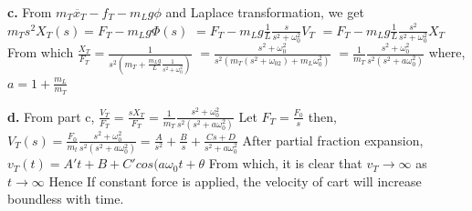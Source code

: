 \documentclass{beamer}
\begin{document}
\begin{frame}
\newline\textbf{c.}\newline
From $m_T\ddot{x_T} - f_T - m_Lg\phi$ and Laplace transformation, we get\newline\newline 
$m_Ts^2X_T(s) = F_T - m_Lg\Phi(s)$\newline\newline
$ = F_T - m_Lg\frac{1}{L}\frac{s}{s^2 + \omega_0^2}V_T$
$ = F_T - m_Lg\frac{1}{L}\frac{s^2}{s^2 + \omega_0^2}X_T$
\newline\newline
From which\newline\newline
$\frac{X_T}{F_T} = \frac{1}{s^2(m_T + \frac{m_Lg}{L}\frac{1}{s^2 + \omega_0^2})}$
$ = \frac{s^2 + \omega_0^2}{s^2(m_T(s^2 + \omega_02) + m_L\omega_0^2)}$
$ = \frac{1}{m_T}\frac{s^2 + \omega_0^2}{s^2(s^2 + a\omega_0^2)}$
\newline\newline
where, \newline \newline
$a = 1 + \frac{m_L}{m_T}$
    
\end{frame}


\begin{frame}
\newline\textbf{d.}\newline
From part c,\newline\newline
$\frac{V_T}{F_T} = \frac{sX_T}{F_T} = \frac{1}{m_T}\frac{s^2 + \omega_0^2}{s^2(s^2 + a\omega_0^2)}$\newline\newline
Let $F_T = \frac{F_0}{s}$ then,\newline\newline
$V_T(s) = \frac{F_0}{m_t}\frac{s^2 + \omega_0^2}{s^2(s^2 + a\omega_0^2)} = \frac{A}{s^2} + \frac{B}{s} + \frac{Cs + D}{s^2 + a\omega_0^2}$\newline\newline
After partial fraction expansion,\newline\newline
$v_T(t) = A't + B + C'cos(a\omega_0t + \theta$\newline\newline
From which, it is clear that 
$v_T \to \infty$ as $ t \to \infty$
\newline\newline
Hence If constant force is applied, the velocity of cart will increase boundless with time.


\end{frame}
\end{document}
